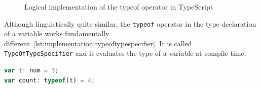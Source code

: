 \begin{figure}[h!]
	\centering
	\def\stackalignment{r}
	\caption{Logical implementation of the typeof operator in TypeScript}
	\label{fig:implementation:typeofimplementation}
\end{figure}


Although linguistically quite similar, the \lstinline|typeof| operator in the type declaration of a variable works fundamentally different~\ref{lst:implementation:typeoftypespecifier}. It is called \lstinline|TypeOfTypeSpecifier| and it evaluates the type of a variable at compile time.

\begin{lstlisting}[language=Typescript,caption=Specifying the type based on a reference variable, label=lst:implementation:typeoftypespecifier]
var t: num = 3;
var count: typeof(t) = 4;
\end{lstlisting}

